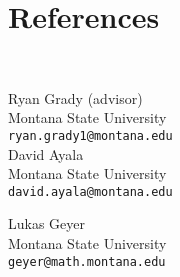 \documentclass[10pt,letter]{moderncv}
\begin{document}
\section{References}

\begin{minipage}[t]{0.16\textwidth}
\
\end{minipage}
\begin{minipage}[t]{0.42\textwidth}


Ryan Grady  (advisor)\\
Montana State University \\
\texttt{ryan.grady1@montana.edu} \\

David Ayala \\
Montana State University \\
\texttt{david.ayala@montana.edu} \\



\end{minipage}
\begin{minipage}[t]{0.42\textwidth}
Lukas Geyer\\
Montana State University\\
\texttt{geyer@math.montana.edu}


\end{minipage}
\end{document}
